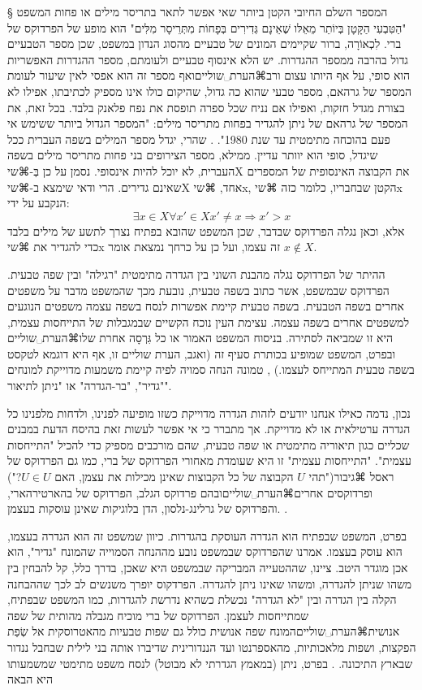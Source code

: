 {​§​ המספר השלם החיובי הקטן ביותר שאי אפשר לתאר בתריסר מילים או פחות
המשפט "הַטִּבְעִי הַקָּטָן בְּיוֹתֵר מֵאֵלּו שֶׁאֵינָם גְּדִירִים בְּפָחוֹת מִתְּרֵיסָר מִלִּים" הוא מופע של הפרדוקס של ברי. לִכְאוֹרָה, ברור שקיימים המונים של טבעיים מהסוג הנדון במשפט, שכן מספר הטבעיים גדול בהרבה ממספר ההגדרות. יש הלא אינסוף טבעיים ולעומתם, מספר ההגדרות האפשריות הוא סופי, על אף היותו עצום ורב⌘הערת␣שוליים{ואף מספר זה הוא אפסי לאין שיעור לעומת המספר של גרהאם, מספר טבעי שהוא כה גדול, שהיקום כולו אינו מספיק לכתיבתו, אפילו לא בצורת מגדל חזקות, ואפילו אם נניח שכל ספרה תופסת את נפח פלאנק בלבד. בכל זאת, את המספר של גרהאם של ניתן להגדיר בפחות מתריסר מילים: "המספר הגדול ביותר ששימש אי פעם בהוכחה מתימטית עד שנת 1980". 
}. שהרי, יגדל מספר המילים בשפה העברית ככל שיגדל, סופי הוא יוותר עדיין. ממילא, מספר הצירופים בני פחות מתריסר מילים בשפה העברית, לא יוכל להיות אינסופי. 
נסמן על כן בְּ-⌘שי{X} את הקבוצה האינסופית של המספרים שאינם גדירים. הרי ודאי שימצא ב-⌘שי{X} אחד, ⌘שי{x}, הקטן שבחבריו, כלומר כזה ⌘שי{x} הנקבע על ידי:
\[
\exists x\in X\mbox{}\forall x'\in X\mbox{}x'\ne x\mbox{}\Rightarrow x'>x
\]
אלא, וכאן נגלה הפרדוקס שבדבר, שכן המשפט שהובא בפתיח נצרך לתשע של מילים בלבד כדי להגדיר את ⌘שי{x} זה עצמו, ועל כן על כרחך נמצאת אומר $x\notin X$.

ההיתר של הפרדוקס נגלה מהבנת השוני בין הגדרה מתימטית "רגילה" ובין שפה טבעית. הפרדוקס שבמשפט, אשר כתוב בשפה טבעית, נובעת מכך שהמשפט מדבר על משפטים אחרים בשפה הטבעית. בשפה טבעית קיימת אפשרות לנסח בשפה עצמה משפטים הנוגעים למשפטים אחרים בשפה עצמה. עצימת העין נוכח הקשיים שבמגבלות של התייחסות עצמית, היא זו שמביאה לסתירה.
בניסוח המשפט האמור או כל גִּרְסָה אחרת שלו⌘הערת␣שוליים{ ובפרט, המשפט שמופיע בכותרת סעיף זה (ואגב, הערת שוליים זו, אף היא דוגמא לטקסט בשפה טבעית המתייחס לעצמו.)
}, טמונה הנחה סמויה לפיה קיימת משמעות מדוייקת למונחים "גדיר", "בר-הגדרה" או "ניתן לתיאור".

נכון, נדמה כאילו אנחנו יודעים לזהות הגדרה מדוייקת כשזו מופיעה לפנינו, ולדחות מלפנינו כל הגדרה ערטילאית או לא מדוייקת. אך מתברר כי אי אפשר לעשות זאת בהיסח הדעת במבנים שכליים כגון תיאוריה מתימטית או שפה טבעית, שהם מורכבים מספיק כדי להכיל "התייחסות עצמית". "התייחסות עצמית" זו היא שעומדת מאחורי הפרדוקס של ברי, כמו גם הפרדוקס של ראסל ⌘גיבור{("תהי $U$ הקבוצה של כל הקבוצות שאינן מכילות את עצמן, האם $U\in U$?")} ופרדוקסים אחרים⌘הערת␣שוליים{ובהם פרדוקס הגלב, הפרדוקס של בהארטירהארי, והפרדוקס של גרלינג-נלסון, הדן בלוגיקות שאינן עוסקות בעצמן. }.

בפרט, המשפט שבפתיח הוא הגדרה העוסקת בהגדרות. כיוון שמשפט זה הוא הגדרה בעצמו, הוא עוסק בעצמו.  אמרנו שהפרדוקס שבמשפט נובע מההנחה הסמוייה שהמונח "גדיר", הוא אכן מוגדר היטב.  ציינו, שההטעייה המבריקה שבמשפט היא שאכן, בדרך כלל, קל להבחין בין משהו שניתן להגדרה, ומשהו שאינו ניתן להגדרה. הפרדקוס יופרך משנשים לב לכך  שההבחנה הקלה בין הגדרה ובין "לא הגדרה" נכשלת כשהיא נדרשת להגדרות, כמו המשפט שבפתיח, שמתייחסות לעצמן. הפרדוקס של ברי מוכיח מגבלה מהותית של שפה אנושית⌘הערת␣שוליים{המונח שפה אנושית כולל גם שפות טבעיות מהאטרוסקית אל שְׂפַת הפקצות, ושפות מלאכותיות, מהאספרנטו ועד הננדורינית שדיברו אותה בני לילית שבחבל ננדור שבארץ התיכונה. 
}. בפרט, ניתן (במאמץ הגדרתי לא מבוטל) לנסח משפט מתימטי שמשמעותו היא הבאה 

}
